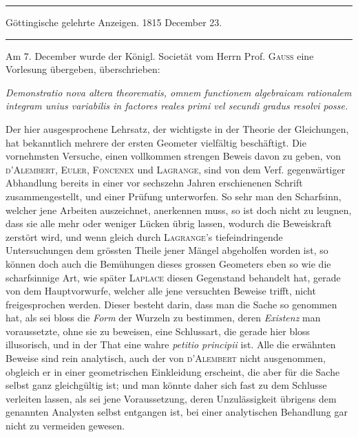 \begin{center}
\rule{0.65\linewidth}{0.4pt}\par
Göttingische gelehrte Anzeigen. 1815 December 23.\par
\rule{0.65\linewidth}{0.4pt}
\end{center}

Am 7. December wurde der Königl. Societät vom Herrn Prof. \textsc{Gauss} eine Vorlesung übergeben, überschrieben:

\begin{center}
\emph{Demonstratio nova altera theorematis, omnem functionem algebraicam rationalem integram unius variabilis in factores reales primi vel secundi gradus resolvi posse.}
\end{center}

Der hier ausgesprochene Lehrsatz, der wichtigste in der Theorie der Gleichungen, hat bekanntlich mehrere der ersten Geometer vielfältig beschäftigt. Die vornehmsten Versuche, einen vollkommen strengen Beweis davon zu geben, von \textsc{d'Alembert}, \textsc{Euler}, \textsc{Foncenex} und \textsc{Lagrange}, sind von dem Verf. gegenwärtiger Abhandlung bereits in einer vor sechszehn Jahren erschienenen Schrift zusammengestellt, und einer Prüfung unterworfen. So sehr man den Scharfsinn, welcher jene Arbeiten auszeichnet, anerkennen muss, so ist doch nicht zu leugnen, dass sie alle mehr oder weniger Lücken übrig lassen, wodurch die Beweiskraft zerstört wird, und wenn gleich durch \textsc{Lagrange}'s tiefeindringende Untersuchungen dem grössten Theile jener Mängel abgeholfen worden ist, so können doch auch die Bemühungen dieses grossen Geometers eben so wie die scharfsinnige Art, wie später \textsc{Laplace} diesen Gegenstand behandelt hat, gerade von dem Hauptvorwurfe, welcher alle jene versuchten Beweise trifft, nicht freigesprochen werden. Dieser besteht darin, dass man die Sache so genommen hat, als sei bloss die \emph{Form} der Wurzeln zu bestimmen, deren \emph{Existenz} man voraussetzte, ohne sie zu beweisen,
eine Schlussart, die gerade hier bloss illusorisch, und in der
That eine wahre \emph{petitio principii} ist. Alle die erwähnten Beweise
sind rein analytisch, auch der von \textsc{d'Alembert} nicht ausgenommen,
obgleich er in einer geometrischen Einkleidung erscheint, die aber
für die Sache selbst ganz gleichgültig ist; und man könnte daher sich
fast zu dem Schlusse verleiten lassen, als sei jene Voraussetzung,
deren Unzulässigkeit übrigens dem genannten Analysten selbst
entgangen ist, bei einer analytischen Behandlung gar nicht zu
vermeiden gewesen.

